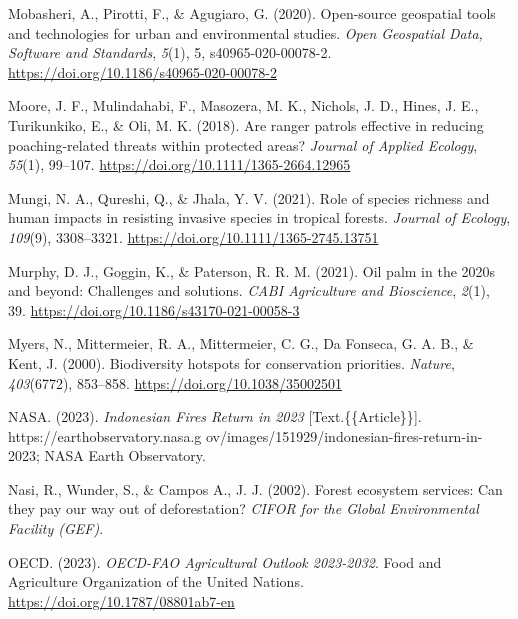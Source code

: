 \documentclass[
  letterpaper,
  DIV=11,
  numbers=noendperiod]{scrreprt}
\newlength{\cslhangindent}
\newlength{\cslentryspacingunit} %
\newenvironment{CSLReferences}[2] %
 {%
  \setlength{\parindent}{0pt}
  \ifodd #1
  \let\oldpar\par
  \def\par{\hangindent=\cslhangindent\oldpar}
  \fi
  \setlength{\parskip}{#2\cslentryspacingunit}
 }%
 {}
\begin{document}
\begin{CSLReferences}{1}{0}
\leavevmode{}%
Mobasheri, A., Pirotti, F., \& Agugiaro, G. (2020). Open-source
geospatial tools and technologies for urban and environmental studies.
\emph{Open Geospatial Data, Software and Standards}, \emph{5}(1), 5,
s40965-020-00078-2. \url{https://doi.org/10.1186/s40965-020-00078-2}

\leavevmode{}%
Moore, J. F., Mulindahabi, F., Masozera, M. K., Nichols, J. D., Hines,
J. E., Turikunkiko, E., \& Oli, M. K. (2018). Are ranger patrols
effective in reducing poaching-related threats within protected areas?
\emph{Journal of Applied Ecology}, \emph{55}(1), 99--107.
\url{https://doi.org/10.1111/1365-2664.12965}

\leavevmode{}%
Mungi, N. A., Qureshi, Q., \& Jhala, Y. V. (2021). Role of species
richness and human impacts in resisting invasive species in tropical
forests. \emph{Journal of Ecology}, \emph{109}(9), 3308--3321.
\url{https://doi.org/10.1111/1365-2745.13751}

\leavevmode{}%
Murphy, D. J., Goggin, K., \& Paterson, R. R. M. (2021). Oil palm in the
2020s and beyond: Challenges and solutions. \emph{CABI Agriculture and
Bioscience}, \emph{2}(1), 39.
\url{https://doi.org/10.1186/s43170-021-00058-3}

\leavevmode{}%
Myers, N., Mittermeier, R. A., Mittermeier, C. G., Da Fonseca, G. A. B.,
\& Kent, J. (2000). Biodiversity hotspots for conservation priorities.
\emph{Nature}, \emph{403}(6772), 853--858.
\url{https://doi.org/10.1038/35002501}

\leavevmode{}%
NASA. (2023). \emph{Indonesian {Fires Return} in 2023}
{[}Text.\{\{Article\}\}{]}. https://earthobservatory.nasa.g
ov/images/151929/indonesian-fires-return-in-2023; {NASA Earth
Observatory}.

\leavevmode{}%
Nasi, R., Wunder, S., \& Campos A., J. J. (2002). Forest ecosystem
services: Can they pay our way out of deforestation? \emph{CIFOR for the
Global Environmental Facility (GEF)}.

\leavevmode{}%
OECD. (2023). \emph{{OECD-FAO Agricultural Outlook} 2023-2032}. {Food
and Agriculture Organization of the United Nations}.
\url{https://doi.org/10.1787/08801ab7-en}


\end{CSLReferences}
\end{document}
